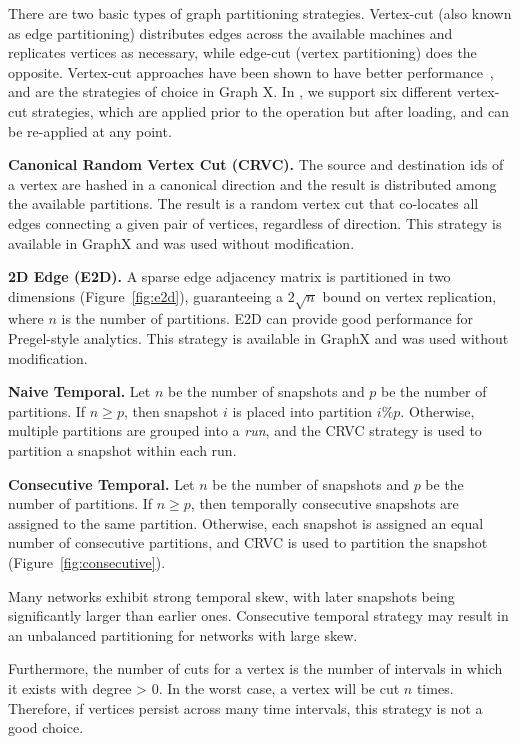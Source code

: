 There are two basic types of graph partitioning strategies. Vertex-cut
(also known as edge partitioning) distributes edges across the
available machines and replicates vertices as necessary, while
edge-cut (vertex partitioning) does the opposite.  Vertex-cut
approaches have been shown to have better
performance~\cite{Gonzalez2012}, and are the strategies of choice in
Graph X.  In \ql, we support six different vertex-cut strategies,
which are applied prior to the operation but after loading, and can be
re-applied at any point.

{\bf Canonical Random Vertex Cut (CRVC).}  The source and destination
ids of a vertex are hashed in a canonical direction and the result is
distributed among the available partitions.  The result is a random
vertex cut that co-locates all edges connecting a given pair of
vertices, regardless of direction.  This strategy is available in
GraphX and was used without modification.

{\bf 2D Edge (E2D).}  A sparse edge adjacency matrix is partitioned in
two dimensions (Figure~\ref{fig:e2d}), guaranteeing a $2 \sqrt{n}$
bound on vertex replication, where $n$ is the number of
partitions. E2D can provide good performance for Pregel-style
analytics.  This strategy is available in GraphX and was used without
modification.

{\bf Naive Temporal.} Let $n$ be the number of snapshots and $p$ be
the number of partitions.  If $n \geq p$, then snapshot $i$ is placed
into partition $i \% p$.  Otherwise, multiple partitions are grouped
into a {\em run}, and the CRVC strategy is used to partition a
snapshot within each run.

{\bf Consecutive Temporal.}  Let $n$ be the number of snapshots and
$p$ be the number of partitions.  If $n \geq p$, then temporally
consecutive snapshots are assigned to the same partition.  Otherwise,
each snapshot is assigned an equal number of consecutive partitions,
and CRVC is used to partition the snapshot
(Figure~\ref{fig:consecutive}).

Many networks exhibit strong temporal skew, with later snapshots being
significantly larger than earlier ones.  Consecutive temporal strategy
may result in an unbalanced partitioning for networks with large skew.

Furthermore, the number of cuts for a vertex is the number of
intervals in which it exists with degree > 0.  In the worst case, a
vertex will be cut $n$ times.  Therefore, if vertices persist across
many time intervals, this strategy is not a good choice.

